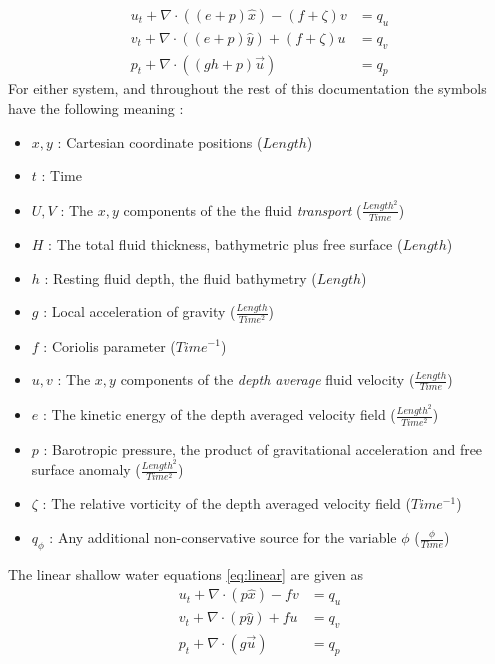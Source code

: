 \documentclass{softwaremanual}
\begin{document}
\begin{subequations}
\begin{align}
u_t  + \nabla \cdot \left( (e + p)\hat{x} \right) - (f+\zeta)v &=  q_u\\
v_t  + \nabla \cdot \left( (e + p)\hat{y} \right) + (f+\zeta)u &=  q_v\\
p_t + \nabla \cdot ( (gh+p)\vec{u} ) &= q_p
\end{align}\label{eq:skewsymmetric}
\end{subequations}
For either system, and throughout the rest of this documentation the symbols have the following meaning :
\begin{itemize}
\item[] $x, y$ : Cartesian coordinate positions ($Length$)
\item[] $t$    : Time
\item[] $U, V$ : The $x,y$ components of the the fluid \textit{transport} ($\frac{Length^2}{Time}$) 
\item[] $H$    : The total fluid thickness, bathymetric plus free surface ($Length$)
\item[] $h$    : Resting fluid depth, the fluid bathymetry ($Length$)
\item[] $g$    : Local acceleration of gravity ($\frac{Length}{Time^2}$)
\item[] $f$    : Coriolis parameter ($Time^{-1}$)
\item[] $u,v$  : The $x,y$ components of the \textit{depth average} fluid velocity ($\frac{Length}{Time}$)
\item[] $e$    : The kinetic energy of the depth averaged velocity field ($\frac{Length^2}{Time^2}$)
\item[] $p$    : Barotropic pressure, the product of gravitational acceleration and free surface anomaly ($\frac{Length^2}{Time^2}$)
\item[] $\zeta$ : The relative vorticity of the depth averaged velocity field ($Time^{-1}$)
\item[] $q_{\phi}$ : Any additional non-conservative source for the variable $\phi$ ($\frac{\phi}{Time}$) 
\end{itemize}

The linear shallow water equations \eqref{eq:linear} are given as
\begin{subequations}
\begin{align}
u_t  + \nabla \cdot \left( p\hat{x} \right) - fv &=  q_u\\
v_t  + \nabla \cdot \left( p\hat{y} \right) + fu &=  q_v\\
p_t + \nabla \cdot ( g\vec{u} ) &= q_p
\end{align}\label{eq:linear}
\end{subequations}
\end{document}
